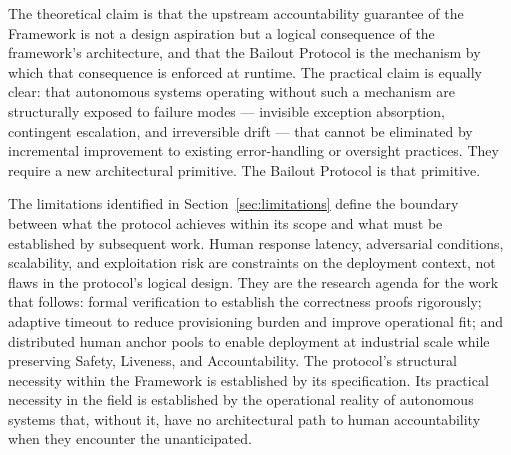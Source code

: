 The theoretical claim is that the upstream accountability guarantee of the \bxthree{} Framework is not a design aspiration but a logical consequence of the framework's architecture, and that the Bailout Protocol is the mechanism by which that consequence is enforced at runtime. The practical claim is equally clear: that autonomous systems operating without such a mechanism are structurally exposed to failure modes --- invisible exception absorption, contingent escalation, and irreversible drift --- that cannot be eliminated by incremental improvement to existing error-handling or oversight practices. They require a new architectural primitive. The Bailout Protocol is that primitive.

The limitations identified in Section~\ref{sec:limitations} define the boundary between what the protocol achieves within its scope and what must be established by subsequent work. Human response latency, adversarial conditions, scalability, and exploitation risk are constraints on the deployment context, not flaws in the protocol's logical design. They are the research agenda for the work that follows: formal verification to establish the correctness proofs rigorously; adaptive timeout to reduce provisioning burden and improve operational fit; and distributed human anchor pools to enable deployment at industrial scale while preserving Safety, Liveness, and Accountability. The protocol's structural necessity within the \bxthree{} Framework is established by its specification. Its practical necessity in the field is established by the operational reality of autonomous systems that, without it, have no architectural path to human accountability when they encounter the unanticipated.